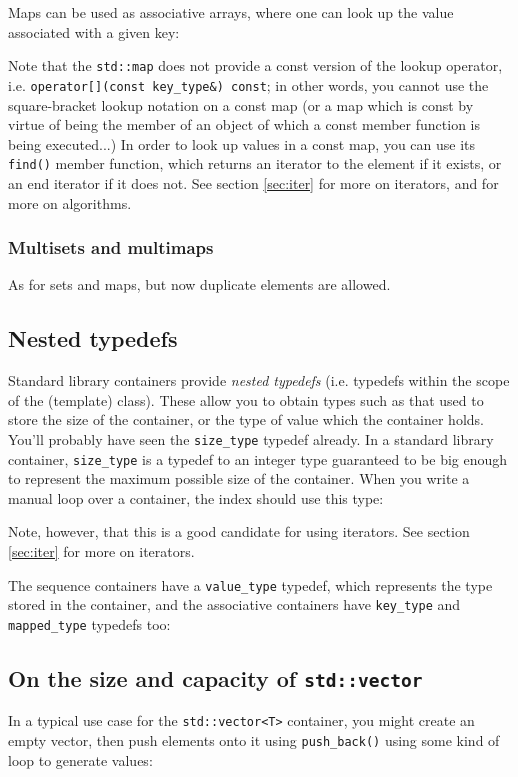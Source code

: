 \documentclass[a4paper]{scrartcl}
\begin{document}
Maps can be used as associative arrays, where one can look up the value associated with a given key:


Note that the \verb|std::map| does not provide a const version of the lookup operator, i.e. \verb|operator[](const key_type&) const|; in other words, you cannot use the square-bracket lookup notation on a const map (or a map which is const by virtue of being the member of an object of which a const member function is being executed...) In order to look up values in a const map, you can use its \verb|find()| member function, which returns an iterator to the element if it exists, or an end iterator if it does not. See section \ref{sec:iter} for more on iterators, and\cite{StandardLibrary} for more on algorithms.



\subsubsection{Multisets and multimaps}\label{sec:containers_associative_multi}
As for sets and maps, but now duplicate elements are allowed.

\subsection{Nested typedefs}
Standard library containers provide \emph{nested typedefs} (i.e. typedefs within the scope of the (template) class). These allow you to obtain types such as that used to store the size of the container, or the type of value which the container holds. You'll probably have seen the \verb|size_type| typedef already. In a standard library container, \verb|size_type| is a typedef to an integer type guaranteed to be big enough to represent the maximum possible size of the container. When you write a manual loop over a container, the index should use this type:



Note, however, that this is a good candidate for using iterators. See section \ref{sec:iter} for more on iterators.

The sequence containers have a \verb|value_type| typedef, which represents the type stored in the container, and the associative containers have \verb|key_type| and \verb|mapped_type| typedefs too:



\subsection{On the size and capacity of \texttt{std::vector}}
In a typical use case for the \verb|std::vector<T>| container, you might create an empty vector, then push elements onto it using \verb|push_back()| using some kind of loop to generate values:
\end{document}
